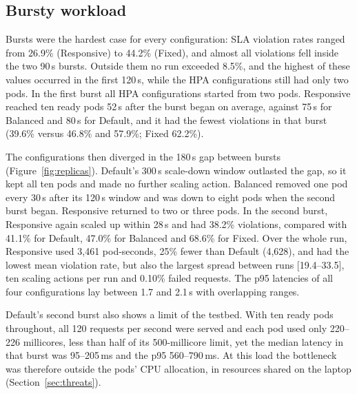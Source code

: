 \documentclass[conference,a4paper]{IEEEtran}
\begin{document}
\subsection{Bursty workload}
Bursts were the hardest case for every configuration: SLA violation rates
ranged from 26.9\% (Responsive) to 44.2\% (Fixed), and almost all violations
fell inside the two 90\,s bursts. Outside them no run exceeded 8.5\%, and the
highest of these values occurred in the first 120\,s, while the HPA
configurations still had only two pods. In the first burst all HPA configurations started
from two pods. Responsive reached ten ready pods 52\,s after the burst began
on average, against 75\,s for Balanced and 80\,s for Default, and it had the
fewest violations in that burst (39.6\% versus 46.8\% and 57.9\%; Fixed
62.2\%).

The configurations then diverged in the 180\,s gap between bursts
(Figure~\ref{fig:replicas}). Default's 300\,s scale-down window outlasted the
gap, so it kept all ten pods and made no further scaling action. Balanced removed one pod every 30\,s after its 120\,s window and was
down to eight pods when the second burst began. Responsive returned to two or
three pods. In the second burst, Responsive again scaled up within 28\,s and
had 38.2\% violations, compared with 41.1\% for Default, 47.0\% for Balanced
and 68.6\% for Fixed. Over the whole run, Responsive used 3{,}461
pod-seconds, 25\% fewer than Default (4{,}628), and had the lowest mean
violation rate, but also the largest spread between runs [19.4--33.5], ten
scaling actions per run and 0.10\% failed requests. The p95 latencies of all
four configurations lay between 1.7 and 2.1\,s with overlapping ranges.

Default's second burst also shows a limit of the testbed. With ten ready pods
throughout, all 120 requests per second were served and each pod used only
220--226 millicores, less than half of its 500-millicore limit, yet the median
latency in that burst was 95--205\,ms and the p95 560--790\,ms. At this load
the bottleneck was therefore outside the pods' CPU allocation, in resources
shared on the laptop (Section~\ref{sec:threats}).
\end{document}
